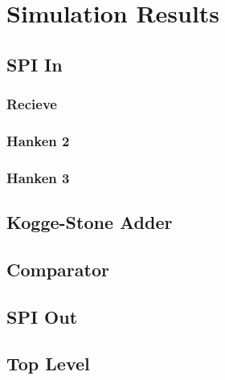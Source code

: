 \section{Simulation Results} \label{sec:simulation_results}

\subsection{SPI In}

\subsubsection{Recieve}

\subsubsection{Hanken 2}

\subsubsection{Hanken 3}

\subsection{Kogge-Stone Adder}

\subsection{Comparator}

\subsection{SPI Out}

\subsection{Top Level}
